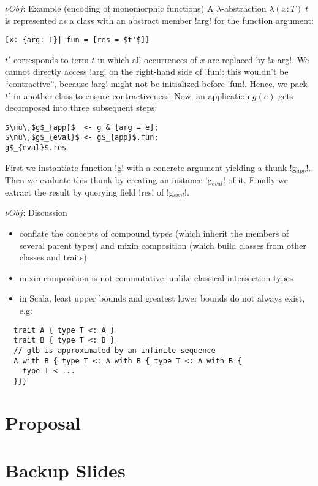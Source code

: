 \documentclass{beamer}
\begin{document}
\begin{frame}[fragile]{${\nu}Obj$: Example (encoding of monomorphic functions)}
A $\lambda$-abstraction $\lambda ( x : T )\; t$ is represented as a
class with an abstract member \code!arg! for the function argument:
\begin{lstlisting}
[x: {arg: T}| fun = [res = $t'$]]
\end{lstlisting}
$t'$ corresponds to term $t$ in which all occurrences of $x$ are
replaced by \code!$x$.arg!. We cannot directly access \code!arg! on
the right-hand side of \code!fun!: this wouldn't be ``contractive'',
because \code!arg! might not be initialized before \code!fun!. Hence,
we pack $t'$ in another class to ensure contractiveness. Now, an
application $g(e)$ gets decomposed into three subsequent steps:
\begin{lstlisting}
$\nu\,$g$_{app}$  <- g & [arg = e];
$\nu\,$g$_{eval}$ <- g$_{app}$.fun;
g$_{eval}$.res
\end{lstlisting}
First we instantiate function \code!g! with a concrete argument
yielding a thunk \code!g$_{app}$!. Then we evaluate this thunk by
creating an instance \code!g$_{eval}$! of it. Finally we extract the
result by querying field \code!res! of \code!g$_{eval}$!.
\end{frame}

\begin{frame}[fragile]{${\nu}Obj$: Discussion}
\begin{itemize}
\item conflate the concepts of compound types (which inherit the
  members of several parent types) and mixin composition (which build
  classes from other classes and traits)
\item mixin composition is not commutative, unlike classical
  intersection types
\item in Scala, least upper bounds and greatest lower bounds do not always exist, e.g:
\end{itemize}
\begin{verbatim}
  trait A { type T <: A }
  trait B { type T <: B }
  // glb is approximated by an infinite sequence
  A with B { type T <: A with B { type T <: A with B {
    type T < ...
  }}}
\end{verbatim}
\end{frame}

\section{Proposal}

\section{Backup Slides}

\end{document}
